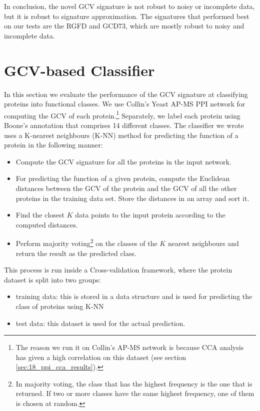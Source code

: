 In conclusion, the novel GCV signature is not robust to noisy or incomplete data, but it is robust to signature approximation. The signatures that performed best on our tests are the RGFD and GCD73, which are mostly robust to noisy and incomplete data.

\section{GCV-based Classifier}
\label{sec:eval_classify}

In this section we evaluate the performance of the GCV signature at classifying proteins into functional classes. We use Collin's Yeast AP-MS PPI network for computing the GCV of each protein.\footnote{The reason we run it on Collin's AP-MS network is because CCA analysis has given a high correlation on this dataset (see section \ref{sec:18_ppi_cca_results}).} Separately, we label each protein using Boone's annotation that comprises 14 different classes. The classifier we wrote uses a K-nearest neighbours (K-NN) method for predicting the function of a protein in the following manner:
\begin{itemize}
 \item Compute the GCV signature for all the proteins in the input network.
 \item For predicting the function of a given protein, compute the Euclidean distances between the GCV of the protein and the GCV of all the other proteins in the training data set. Store the distances in an array and sort it. 
 \item Find the closest $K$ data points to the input protein according to the computed distances.
 \item Perform majority voting\footnote{In majority voting, the class that has the highest frequency is the one that is returned. If two or more classes have the same highest frequency, one of them is chosen at random.} on the classes of the $K$ nearest neighbours and return the result as the predicted class.
\end{itemize}

This process is run inside a Cross-validation framework, where the protein dataset is split into two groups:
\begin{itemize}
 \item training data: this is stored in a data structure and is used for predicting the class of proteins using K-NN
 \item test data: this dataset is used for the actual prediction.
\end{itemize}

